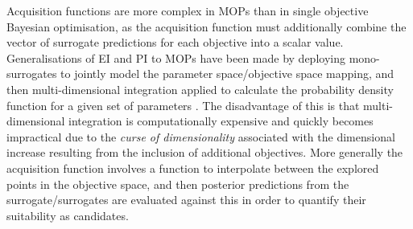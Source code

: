 \documentclass[runningheads]{llncs}
\begin{document}
Acquisition functions are more complex in MOPs than in single objective Bayesian optimisation, as the acquisition function must additionally combine the vector of surrogate predictions for each objective into a scalar value. Generalisations of EI and PI to MOPs have been made by deploying mono-surrogates to jointly model the parameter space/objective space mapping, and then multi-dimensional integration applied to calculate the probability density function for a given set of parameters \cite{emmerich2006single,keane2006statistical}. The disadvantage of this is that multi-dimensional integration is computationally expensive and quickly becomes impractical due to the \textit{curse of dimensionality} associated with the dimensional increase resulting from the inclusion of additional objectives. More generally the acquisition function involves a function to interpolate between the explored points in the objective space, and then posterior predictions from the surrogate/surrogates are evaluated against this in order to quantify their suitability as candidates. 
\end{document}
